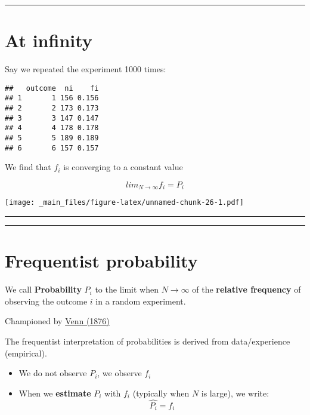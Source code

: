 \documentclass[
]{book}
\providecommand{\tightlist}{%
  \setlength{\itemsep}{0pt}\setlength{\parskip}{0pt}}
\begin{document}
\begin{center}\rule{0.5\linewidth}{0.5pt}\end{center}

\hypertarget{at-infinity}{%
\section{At infinity}\label{at-infinity}}

Say we repeated the experiment 1000 times:

\begin{verbatim}
##   outcome  ni    fi
## 1       1 156 0.156
## 2       2 173 0.173
## 3       3 147 0.147
## 4       4 178 0.178
## 5       5 189 0.189
## 6       6 157 0.157
\end{verbatim}

We find that \(f_i\) is converging to a constant value

\[lim_{N\rightarrow \infty} f_i = P_i\]

\texttt{[image: \_main\_files/figure-latex/unnamed-chunk-26-1.pdf]}

\begin{center}\rule{0.5\linewidth}{0.5pt}\end{center}

\begin{center}\rule{0.5\linewidth}{0.5pt}\end{center}

\hypertarget{frequentist-probability}{%
\section{Frequentist probability}\label{frequentist-probability}}

We call \textbf{Probability} \(P_i\) to the limit when \(N \rightarrow \infty\) of the \textbf{relative frequency} of observing the outcome \(i\) in a random experiment.

Championed by \href{https://plato.stanford.edu/entries/probability-interpret/\#ClaPro}{Venn (1876)}

The frequentist interpretation of probabilities is derived from data/experience (empirical).

\begin{itemize}
\tightlist
\item
  We do not observe \(P_i\), we observe \(f_i\)
\item
  When we \textbf{estimate} \(P_i\) with \(f_i\) (typically when \(N\) is large), we write: \[\hat{P_i}=f_i\]
\end{itemize}
\end{document}

